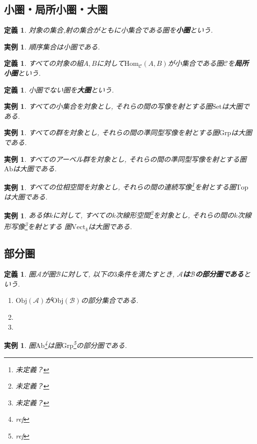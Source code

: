 \documentclass[dvipdfmx]{jsbook}
\theoremstyle{plain}
\newtheorem{Def}[thm]{定義}
\newtheorem{example}[thm]{実例}
\begin{document}
\subsection{小圏・局所小圏・大圏}
\begin{Def}
対象の集合,射の集合がともに小集合である圏を{\bf 小圏}という.
\end{Def}
\begin{example}
順序集合は小圏である.
\end{example}
\begin{Def}
すべての対象の組$A,B$に対して$\mathrm{Hom}_{\mathscr{C}}(A,B)$が小集合である圏$\mathscr{C}$を{\bf 局所小圏}という.
\end{Def}
\begin{Def}
小圏でない圏を{\bf 大圏}という.
\end{Def}

\begin{example}
すべての小集合を対象とし, それらの間の写像を射とする圏$\mathrm{Set}$は大圏である.
\end{example}
\begin{example}
すべての群を対象とし, それらの間の準同型写像を射とする圏$\mathrm{Grp}$は大圏である.
\end{example}
\begin{example}
すべてのアーベル群を対象とし, それらの間の準同型写像を射とする圏$\mathrm{Ab}$は大圏である.
\end{example}
\begin{example}
すべての位相空間を対象とし, それらの間の連続写像\footnote{未定義？}を射とする圏$\mathrm{Top}$は大圏である.
\end{example}
\begin{example}
ある体$k$に対して,
すべての$k$次線形空間\footnote{未定義？}を対象とし,
それらの間の$k$次線形写像\footnote{未定義？}を射とする
圏$\mathrm{Vect}_k$は大圏である.
\end{example}
\subsection{部分圏}
\begin{Def}
圏$\mathscr{A}$が圏$\mathscr{B}$に対して, 以下の$3$条件を満たすとき, {\bf $\mathscr{A}$は$\mathscr{B}$の部分圏である}という.
\begin{enumerate}
\item $\mathrm{Obj}(\mathscr{A})$が$\mathrm{Obj}(\mathscr{B})$の部分集合である.
\item
\item
\end{enumerate}
\end{Def}
\begin{example}
圏$\mathrm{Ab}$\footnote{ref}は圏$\mathrm{Grp}$\footnote{ref}の部分圏である.
\end{example}
\end{document}
